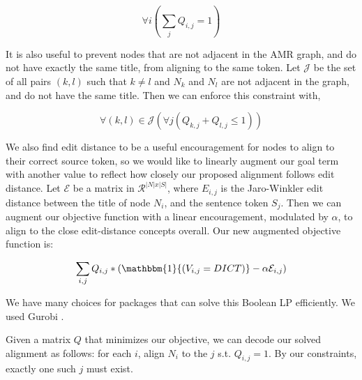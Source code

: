 \[\forall i (\sum_{j} Q_{i,j} = 1)\]

It is also useful to prevent nodes that are not adjacent in the AMR graph, and do not have exactly the same title, from aligning to the same token. Let $\mathcal{J}$ be the set of all pairs $(k,l)$ such that $k \neq l$ and $N_k$ and $N_l$ are not adjacent in the graph, and do not have the same title. Then we can enforce this constraint with,

\[\forall (k,l) \in \mathcal{J} (\forall j (Q_{k,j} + Q_{l,j} \leq 1))\]

We also find edit distance to be a useful encouragement for nodes to align to their correct source token, so we would like to linearly augment our goal term with another value to reflect how closely our proposed alignment follows edit distance. Let $\mathcal{E}$ be a matrix in $\mathcal{R}^{|N|x|S|}$, where $E_{i,j}$ is the Jaro-Winkler edit distance between the title of node $N_i$, and the sentence token $S_j$. Then we can augment our objective function with a linear encouragement, modulated by $\alpha$, to align to the close edit-distance concepts overall. Our new augmented objective function is:

\[\sum_{i,j} Q_{i,j}*(\mathbbm{1}{(V_{i,j} = DICT)} - \alpha \mathcal{E}_{i,j})\]

We have many choices for packages that can solve this Boolean LP efficiently. We used Gurobi \needcite.

Given a matrix $Q$ that minimizes our objective, we can decode our solved alignment as follows: for each $i$, align $N_i$ to the $j$ s.t. $Q_{i,j} = 1$. By our constraints, exactly one such $j$ must exist.
